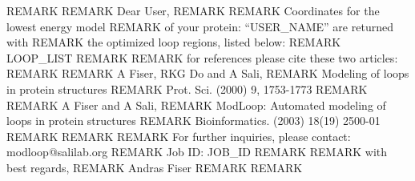 REMARK 
REMARK     Dear User,
REMARK    
REMARK     Coordinates for the lowest energy model 
REMARK     of your protein: ``USER_NAME''  are returned with 
REMARK     the optimized loop regions, listed below: 
REMARK     LOOP_LIST
REMARK     
REMARK     for references please cite these two articles:
REMARK
REMARK        A Fiser, RKG Do and A Sali, 
REMARK        Modeling of loops in protein structures
REMARK        Prot. Sci. (2000) 9, 1753-1773
REMARK
REMARK        A Fiser and A Sali,
REMARK        ModLoop: Automated modeling of loops in protein structures
REMARK        Bioinformatics. (2003) 18(19) 2500-01
REMARK
REMARK
REMARK     For further inquiries, please contact: modloop@salilab.org
REMARK     Job ID: JOB_ID
REMARK     
REMARK     with best regards,
REMARK     Andras Fiser
REMARK
REMARK
